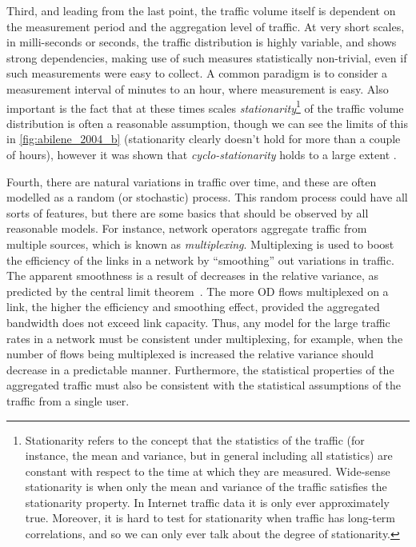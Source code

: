 

Third, and leading from the last point, the traffic volume itself is
dependent on the measurement period and the aggregation level of
traffic. At very short scales, in milli-seconds or seconds, the
traffic distribution is highly variable, and shows strong
dependencies, making use of such measures statistically non-trivial,
even if such measurements were easy to collect.  A common paradigm is
to consider a measurement interval of minutes to an hour, where
measurement is easy. Also important is the fact that at these times
scales \emph{stationarity}\footnote{Stationarity refers to the concept
  that the statistics of the traffic (for instance, the mean and
  variance, but in general including all statistics) are constant with
  respect to the time at which they are measured. Wide-sense
  stationarity is when only the mean and variance of the traffic
  satisfies the stationarity property.  In Internet traffic data it is
  only ever approximately true.  Moreover, it is hard to test for
  stationarity when traffic has long-term correlations, and so we can
  only ever talk about the degree of stationarity.} of the traffic
volume distribution is often a reasonable assumption, though we can
see the limits of this in \autoref{fig:abilene_2004_b} (stationarity clearly
doesn't hold for more than a couple of hours), however it was shown
that {\em cyclo-stationarity} holds to a large extent
\cite{Soule04TMLargest}.

Fourth, there are natural variations in traffic over time, and these
are often modelled as a random (or stochastic) process. This random
process could have all sorts of features, but there are some basics
that should be observed by all reasonable models. For instance,
network operators aggregate traffic from multiple sources, which is
known as \emph{multiplexing}. Multiplexing is used to boost the
efficiency of the links in a network by ``smoothing'' out variations
in traffic. The apparent smoothness is a result of decreases in the
relative variance, as predicted by the central limit
theorem~\cite{Cao01Nonstationarity}.  The more OD flows multiplexed on a
link, the higher the efficiency and smoothing effect, provided the
aggregated bandwidth does not exceed link capacity. Thus, any model
for the large traffic rates in a network must be consistent under
multiplexing, for example, when the number of flows being multiplexed
is increased the relative variance should decrease in a predictable
manner. Furthermore, the statistical properties of the aggregated
traffic must also be consistent with the statistical assumptions of
the traffic from a single user.

